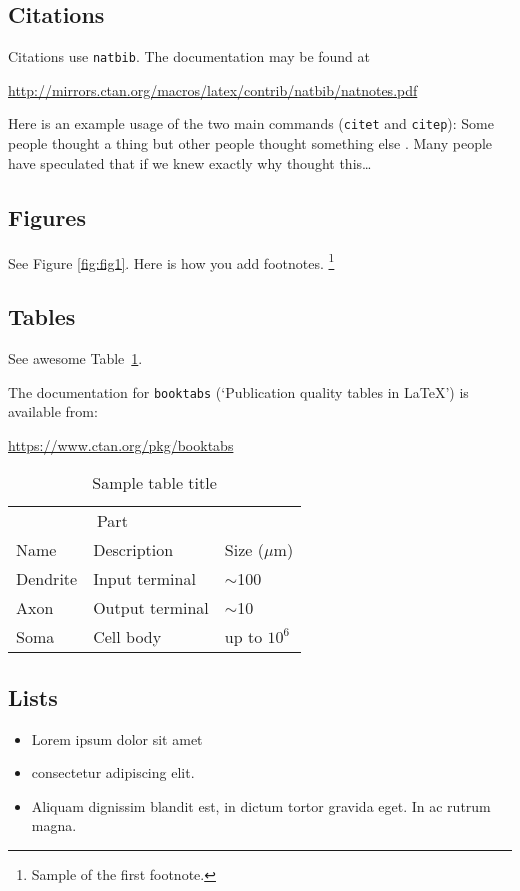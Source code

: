 \documentclass{article}
\begin{document}
\subsection{Citations}
Citations use \verb+natbib+. The documentation may be found at
\begin{center}
	\url{http://mirrors.ctan.org/macros/latex/contrib/natbib/natnotes.pdf}
\end{center}

Here is an example usage of the two main commands (\verb+citet+ and \verb+citep+): Some people thought a thing \citep{kour2014real, hadash2018estimate} but other people thought something else \citep{kour2014fast}. Many people have speculated that if we knew exactly why \citet{kour2014fast} thought this\dots

\subsection{Figures}
\lipsum[10]
See Figure \ref{fig:fig1}. Here is how you add footnotes. \footnote{Sample of the first footnote.}
\lipsum[11]



\subsection{Tables}
See awesome Table~\ref{tab:table}.

The documentation for \verb+booktabs+ (`Publication quality tables in LaTeX') is available from:
\begin{center}
	\url{https://www.ctan.org/pkg/booktabs}
\end{center}


\begin{table}
	\caption{Sample table title}
	\centering
	\begin{tabular}{lll}
		\toprule
		\multicolumn{2}{c}{Part}                   \\
		\cmidrule(r){1-2}
		Name     & Description     & Size ($\mu$m) \\
		\midrule
		Dendrite & Input terminal  & $\sim$100     \\
		Axon     & Output terminal & $\sim$10      \\
		Soma     & Cell body       & up to $10^6$  \\
		\bottomrule
	\end{tabular}
	\label{tab:table}
\end{table}

\subsection{Lists}
\begin{itemize}
	\item Lorem ipsum dolor sit amet
	\item consectetur adipiscing elit.
	\item Aliquam dignissim blandit est, in dictum tortor gravida eget. In ac rutrum magna.
\end{itemize}
\end{document}
